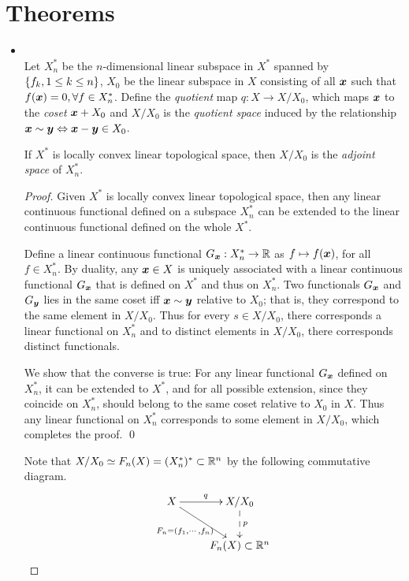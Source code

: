 \documentclass[11pt]{article}
\begin{document}
\newpage
\section{Theorems}
\begin{itemize}
\item \begin{proposition} \citep{gel2014generalized} \\
Let $X_{n}^{*}$ be the $n$-dimensional linear subspace in $X^{*}$ spanned by $\left\{f_{k}, 1\le k\le n\right\}$, $X_{0}$ be the linear subspace in $X$ consisting of all $\boldsymbol{x}$ such that $f(\boldsymbol{x})= 0, \forall f\in X_{n}^{*}$. Define the \emph{quotient} map $q: X \rightarrow X/X_{0}$, which maps $\boldsymbol{x}$ to the \emph{coset} $\boldsymbol{x}+X_{0}$ and $X/X_{0}$ is the \emph{quotient space} induced by the relationship $\boldsymbol{x}\sim \boldsymbol{y} \Leftrightarrow \boldsymbol{x}-\boldsymbol{y}\in X_{0}$. 

If $X^{*}$ is locally convex linear topological space, then $X/X_{0}$ is the \emph{adjoint space} of $X_{n}^{*}$.
\end{proposition}
\begin{proof}
Given $X^{*}$ is locally convex linear topological space, then any linear continuous functional defined on a subspace $X_{n}^{*}$ can be extended to the linear continuous functional defined on the whole $X^{*}$.

Define a linear continuous functional $G_{\boldsymbol{x}}: X_{n}^{*} \rightarrow {\mathbb R}$ as $f \mapsto f(\boldsymbol{x})$, for all $f\in X_{n}^{*}$. 
By duality, any $\boldsymbol{x}\in X$ is uniquely associated with a linear continuous functional $G_{\boldsymbol{x}}$ that is defined on $X^{*}$ and thus on $X_{n}^{*}$. Two functionals $G_{\boldsymbol{x}}$ and $G_{\boldsymbol{y}}$ lies in the same coset iff $\boldsymbol{x}\sim \boldsymbol{y}$ relative to $X_{0}$; that is, they correspond to the same element in $X/X_{0}$. Thus for every $s\in X/X_{0}$, there corresponds a linear functional on $X_{n}^{*}$ and to distinct elements in $X/X_{0}$, there corresponds distinct functionals.

We show that the converse is true: For any linear functional $G_{\boldsymbol{x}}$ defined on $X_{n}^{*}$, it can be extended to $X^{*}$, and for all possible extension, since they coincide on $X_{n}^{*}$, should belong to the same coset relative to $X_{0}$ in $X$. Thus any linear functional on $X_{n}^{*}$ corresponds to some element in $X/X_{0}$, which completes the proof. \qed
 
Note that $X/X_{0}\simeq F_{n}(X)= (X_{n}^{*})^{*}\subset {\mathbb R}^{n}$ by the following commutative diagram.
\begin{align*}
\xymatrix{
X \ar[rd]_{F_{n}= (f_{1},\cdots,f_{n})} \ar[r]^q & X/X_{0}  \ar@{-->}[d]^{p}\\
&F_{n}(X)\subset \bR^{n}
}
\end{align*}
\end{proof}
\vspace{15pt}



\end{itemize}
\end{document}
